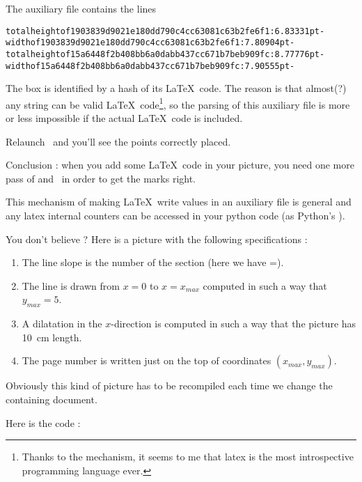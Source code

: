 The auxiliary file contains the lines
\begin{verbatim}
totalheightof1903839d9021e180dd790c4cc63081c63b2fe6f1:6.83331pt-
widthof1903839d9021e180dd790c4cc63081c63b2fe6f1:7.80904pt-
totalheightof15a6448f2b408bb6a0dabb437cc671b7beb909fc:8.77776pt-
widthof15a6448f2b408bb6a0dabb437cc671b7beb909fc:7.90555pt-
\end{verbatim}

The box is identified by a hash of its \LaTeX\ code. The reason is that almost(?) any string can be valid \LaTeX\ code\footnote{Thanks to the  mechanism, it seems to me that latex is the most introspective programming language ever.}, so the parsing of this auxiliary file is more or less impossible if the actual \LaTeX\ code is included.

Relaunch \pdfLaTeX\ and you'll see the points correctly placed.

Conclusion : when you add some \LaTeX\ code in your picture, you need one more pass of \pdfLaTeX and \phystricks\ in order to get the marks right.

This mechanism of making \LaTeX\ write values in an auxiliary file is general and any latex internal counters can be accessed in your python code (as Python's ).

You don't believe ? Here is a picture with the following specifications :
\begin{enumerate}
    \item
        The line slope is the number of the section (here we have \info{\thesection}=\thesection).
\item
The line is drawn from \( x=0\) to \( x=x_{max}\) computed in such a way that \( y_{max}=5\). 
\item
A dilatation in the \( x\)-direction is computed in such a way that the picture has \SI{10}{\centi\meter} length.
\item
    The page number is written just on the top of coordinates \( (x_{max},y_{max})\).
\end{enumerate}

\begin{center}
   
\end{center}

Obviously this kind of picture has to be recompiled each time we change the containing document.

Here is the code :



